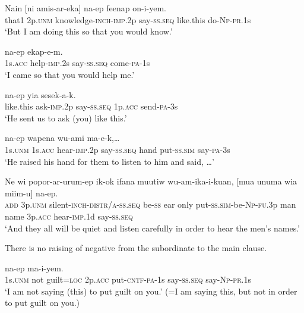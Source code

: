 \ea%
\label{ex:8:x1615}
\gll Nain  [ni  amis-ar-eka]  na-ep  feenap on-i-yem.\\
that1 2p.\textsc{unm} knowledge-\textsc{inch}-\textsc{imp}.2p  say-\textsc{ss}.\textsc{seq} like.this do-\textsc{Np}-\textsc{pr}.1s\\
\glt`But I am doing this so that you would know.'
\z


\ea%
\label{ex:8:x1617}
  na-ep  ekap-e-m. \\
1s.\textsc{acc} help-\textsc{imp}.2s say-\textsc{ss}.\textsc{seq} come-\textsc{pa}-1s\\
\glt`I came so that you would help me.'
\z


\ea%
\label{ex:8:x1618}
  na-ep  yia  sesek-a-k. \\
like.this  ask-\textsc{imp}.2p say-\textsc{ss}.\textsc{seq} 1p.\textsc{acc} send-\textsc{pa}-3s\\
\glt`He sent us to ask (you) like this.'
\z


\ea%
\label{ex:8:x1619}
 na-ep wapena wu-ami ma-e-k,{\dots}\\
1s.\textsc{unm} 1s.\textsc{acc} hear-\textsc{imp}.2p say-\textsc{ss}.\textsc{seq} hand put-\textsc{ss}.\textsc{sim} say-\textsc{pa}-3s\\
\glt`He raised his hand for them to listen to him and said, {\dots}'
\z


\ea%
\label{ex:8:x1627}
\gll Ne  wi  popor-ar-urum-ep  ik-ok  ifana  muutiw wu-am-ika-i-kuan,  [mua  unuma  wia  miim-u] na-ep.\\
\textsc{add} 3p.\textsc{unm} silent-\textsc{inch}-\textsc{distr}/\textsc{a}-\textsc{ss}.\textsc{seq} be-\textsc{ss} ear  only put-\textsc{ss}.\textsc{sim}-be-\textsc{Np}-\textsc{fu}.3p  man  name  3p.\textsc{acc} hear-\textsc{imp}.1d say-\textsc{ss}.\textsc{seq}\\
\glt`And they all will be quiet and listen carefully in order to hear the men's names.'
\z


There is no raising of negative from the subordinate to the main clause. 

\ea%
\label{ex:8:x1623}
\gll [Yo  me  pina=pa  nia  wu-ek-a-m]  na-ep ma-i-yem. \\
1s.\textsc{unm} not guilt=\textsc{loc} 2p.\textsc{acc} put-\textsc{cntf}-\textsc{pa}-1s say-\textsc{ss}.\textsc{seq} say-\textsc{Np}-\textsc{pr}.1s\\
\glt`I am not saying (this) to put guilt on you.' (=I am saying this, but not in order to put guilt on you.)
\z


